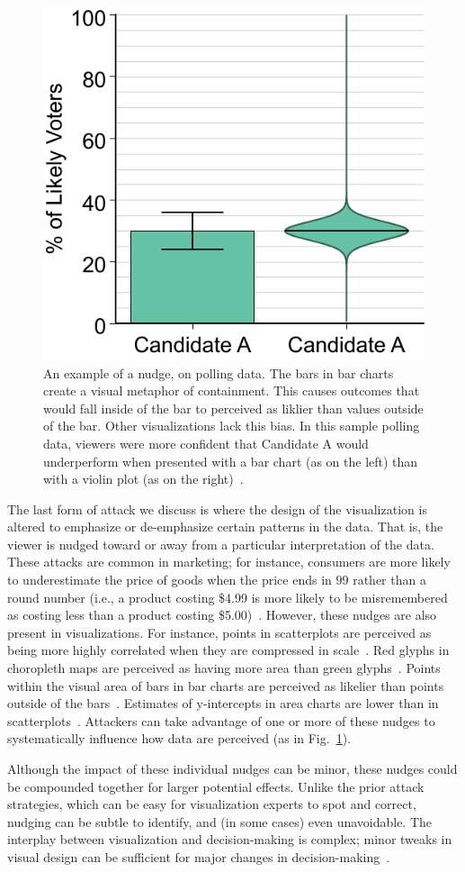 \documentclass{vgtc}                          %
\begin{document}
\begin{figure}[!ht]
	\centering
	\includegraphics[width=0.45\columnwidth]{pictures/within}
	\caption{An example of a nudge, on polling data. The bars in bar charts create a visual metaphor of containment. This causes outcomes that would fall inside of the bar to perceived as liklier than values outside of the bar. Other visualizations lack this bias. In this sample polling data, viewers were more confident that Candidate A would underperform when presented with a bar chart (as on the left) than with a violin plot (as on the right)~\protect\cite{correll2014error}.}
	\label{fig:nudge}
\end{figure}

The last form of attack we discuss is where the design of the visualization is altered to emphasize or de-emphasize certain patterns in the data. That is, the viewer is nudged toward or away from a particular interpretation of the data. These attacks are common in marketing; for instance, consumers are more likely to underestimate the price of goods when the price ends in $99$ rather than a round number (i.e., a product costing \$4.99 is more likely to be misremembered as costing less than a product costing \$5.00)~\cite{schindler1989effects}. However, these nudges are also present in visualizations. For instance, points in scatterplots are perceived as being more highly correlated when they are compressed in scale~\cite{cleveland1982variables}. Red glyphs in choropleth maps are perceived as having more area than green glyphs~\cite{cleveland1983color}. Points within the visual area of bars in bar charts are perceived as likelier than points outside of the bars~\cite{newman2012bar}. Estimates of y-intercepts in area charts are lower than in scatterplots~\cite{correll2017regression}. Attackers can take advantage of one or more of these nudges to systematically influence how data are perceived (as in Fig.~\ref{fig:nudge}). 

Although the impact of these individual nudges can be minor, these nudges could be compounded together for larger potential effects. Unlike the prior attack strategies, which can be easy for visualization experts to spot and correct, nudging can be subtle to identify, and (in some cases) even unavoidable. The interplay between visualization and decision-making is complex; minor tweaks in visual design can be sufficient for major changes in decision-making~\cite{inbar2007graphical}.
\end{document}

